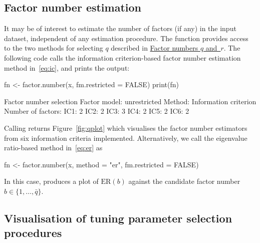 \subsection{Factor number estimation}

It may be of interest to estimate the number of factors (if any) in the input dataset, independent of any estimation procedure. The function  provides access to the two methods for selecting $q$ described in \hyperref[sec:tuning:factor]{Factor numbers $q$ and~$r$}.
The following code calls the information criterion-based factor number estimation method in~\eqref{eq:ic}, and prints the output: 
\begin{example}
fn <- factor.number(x, fm.restricted = FALSE)
print(fn)

Factor number selection 
Factor model: unrestricted
Method: Information criterion
Number of factors:
IC1: 2
IC2: 2
IC3: 3
IC4: 2
IC5: 2
IC6: 2
\end{example}
Calling  returns Figure~\ref{fig:qplot} which visualises the factor number estimators from six information criteria implemented.
Alternatively, we call the eigenvalue ratio-based method in~\eqref{eq:er} as
\begin{example}
fn <- factor.number(x, method = "er", fm.restricted = FALSE)
\end{example}
In this case,  produces a plot of $\text{ER}(b)$ against the candidate factor number $b \in \{1, \ldots, \bar{q}\}$.

\subsection{Visualisation of tuning parameter selection procedures}
\label{sec:package:order}

